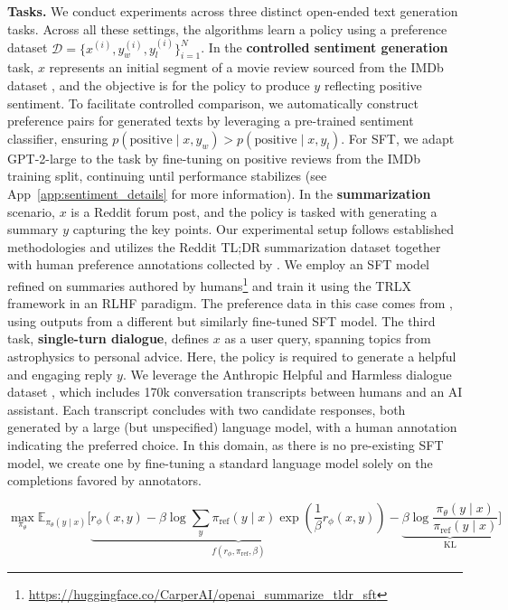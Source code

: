 \textbf{Tasks.} We conduct experiments across three distinct open-ended text generation tasks. Across all these settings, the algorithms learn a policy using a preference dataset $\mathcal{D}=\bigl\{x^{(i)}, y_w^{(i)}, y_l^{(i)}\bigr\}_{i=1}^N$. In the \textbf{controlled sentiment generation} task, $x$ represents an initial segment of a movie review sourced from the IMDb dataset \cite{maas-EtAl:2011:ACL-HLT2011}, and the objective is for the policy to produce $y$ reflecting positive sentiment. To facilitate controlled comparison, we automatically construct preference pairs for generated texts by leveraging a pre-trained sentiment classifier, ensuring $p(\text{positive}\mid x,y_w)>p(\text{positive}\mid x,y_l)$. For SFT, we adapt GPT-2-large to the task by fine-tuning on positive reviews from the IMDb training split, continuing until performance stabilizes (see App~\ref{app:sentiment_details} for more information). In the \textbf{summarization} scenario, $x$ is a Reddit forum post, and the policy is tasked with generating a summary $y$ capturing the key points. Our experimental setup follows established methodologies and utilizes the Reddit TL;DR summarization dataset \citep{volske-etal-2017-tl} together with human preference annotations collected by \citeauthor{stiennon2022learning}. We employ an SFT model refined on summaries authored by humans\footnote{\url{https://huggingface.co/CarperAI/openai_summarize_tldr_sft}} and train it using the TRLX framework \citep{leandro_von_werra_2023_7790115} in an RLHF paradigm. The preference data in this case comes from \citeauthor{stiennon2022learning}, using outputs from a different but similarly fine-tuned SFT model. The third task, \textbf{single-turn dialogue}, defines $x$ as a user query, spanning topics from astrophysics to personal advice. Here, the policy is required to generate a helpful and engaging reply $y$. We leverage the Anthropic Helpful and Harmless dialogue dataset \citep{bai2022training}, which includes 170k conversation transcripts between humans and an AI assistant. Each transcript concludes with two candidate responses, both generated by a large (but unspecified) language model, with a human annotation indicating the preferred choice. In this domain, as there is no pre-existing SFT model, we create one by fine-tuning a standard language model solely on the completions favored by annotators.

\begin{equation}\label{eq:AC}
    \max_{\pi_{\theta}}\mathbb{E}_{\pi_{\theta}(y\mid x)}\bigg[\underbrace{r_{\phi}(x, y) -\beta\log\sum_{y}\pi_\text{ref}(y\mid x)\exp\left(\frac{1}{\beta}r_{\phi}(x, y)\right)}_{f(r_{\phi}, \pi_\text{ref}, \beta)} - \underbrace{\beta\log\frac{\pi_{\theta}(y\mid x)}{\pi_\text{ref}(y\mid x)}}_{\text{KL}}\bigg]
\end{equation}


